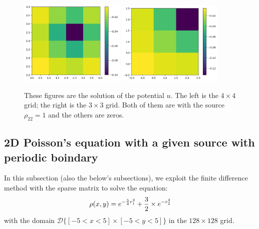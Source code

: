 \documentclass[12pt]{article}
\begin{document}
    \begin{figure}[H]
        \centering 
        \includegraphics[width = 0.45\textwidth]{./fig/1.1.png}
        \includegraphics[width = 0.45\textwidth]{./fig/1.2.png} 
        \caption{These figures are the solution of the potential $u$. The left is the $4 \times 4$ grid; the right is the $3 \times 3$ grid. Both of them are with the source $\rho_{22} = 1$ and the others are zeros.}\label{q1}
    \end{figure}

    \subsection{2D Poisson's equation with a given source with periodic boindary}\label{eq}
    In this subsection (also the below's subsections), we exploit the finite difference method with the sparse matrix to solve the equation:
    \[
        \rho(x,y) = e^{-{5 \over 4} r^{2}_{1}} + {3 \over 2} \times e^{-r^{2}_{2}}
    \]
    with the domain $\mathscr{D}\big\{ [-5 < x < 5] \times [-5 < y < 5] \big\}$ in the $128 \times 128$ grid.
\end{document}

